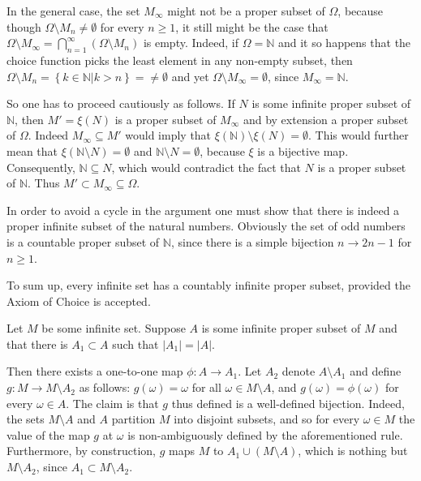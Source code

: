 \documentclass[a4paper]{article}
\newcommand{\obj}[1]{\left\{{#1}\right\}}
\newcommand{\brac}[1]{{\left({#1}\right)}}
\begin{document}
In the general case, the set $M_\infty$ might not be a proper subset of $\Omega$, because though $\Omega\setminus M_n\neq \emptyset$ for every $n\geq 1$, it still might be the case that  $\Omega\setminus M_\infty = \bigcap_{n=1}^\infty\brac{\Omega\setminus M_n}$ is empty. Indeed, if $\Omega=\mathbb{N}$ and it so happens that the choice function picks the least element in any non-empty subset, then $\Omega\setminus M_n = \obj{k\in \mathbb{N}|k>n} = \neq \emptyset$ and yet $\Omega\setminus M_\infty = \emptyset$, since $M_\infty = \mathbb{N}$.

So one has to proceed cautiously as follows. If $N$ is some infinite proper subset of $\mathbb{N}$, then $M'=\xi(N)$ is a proper subset of $M_\infty$ and by extension a proper subset of $\Omega$. Indeed $M_\infty\subseteq M'$ would imply that $\xi(\mathbb{N})\setminus \xi(N)=\emptyset$. This would further mean that $\xi(\mathbb{N}\setminus N)=\emptyset$ and $\mathbb{N}\setminus N=\emptyset$, because $\xi$ is a bijective map. Consequently, $\mathbb{N}\subseteq N$, which would contradict the fact that $N$ is a proper subset of $\mathbb{N}$. Thus $M'\subset M_\infty\subseteq \Omega$.

In order to avoid a cycle in the argument one must show that there is indeed a proper infinite subset of the natural numbers. Obviously the set of odd numbers is a countable proper subset of $\mathbb{N}$, since there is a simple bijection $n\to 2n-1$ for $n\geq 1$.

To sum up, every infinite set has a countably infinite proper subset, provided the Axiom of Choice is accepted.

Let $M$ be some infinite set. Suppose $A$ is some infinite proper subset of $M$ and that there is $A_1\subset A$ such that $|A_1|=|A|$. %

Then there exists a one-to-one map $\phi:A\to A_1$. Let $A_2$ denote $A\setminus A_1$ and define $g:M\to M\setminus A_2$ as follows: $g(\omega)=\omega$ for all $\omega\in M\setminus A$, and $g(\omega)=\phi(\omega)$ for every $\omega\in A$.
The claim is that $g$ thus defined is a well-defined bijection. Indeed, the sets $M\setminus A$ and $A$ partition $M$ into disjoint subsets, and so for every $\omega\in M$ the value of the map $g$ at $\omega$ is non-ambiguously defined by the aforementioned rule. Furthermore, by construction, $g$ maps $M$ to $A_1 \cup \brac{M\setminus A}$, which is nothing but $M\setminus A_2$, since $A_1\subset M\setminus A_2$.
\end{document}
